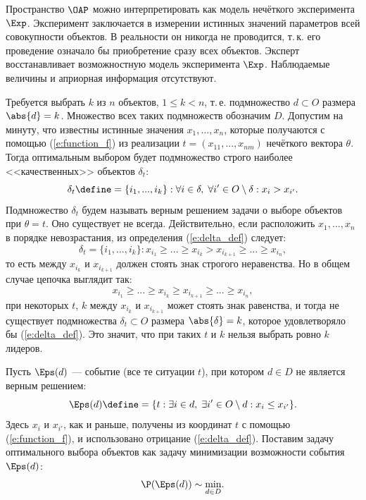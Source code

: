 Пространство $\OAP$ можно интерпретировать как модель нечёткого эксперимента $\Exp$. Эксперимент  заключается в измерении истинных значений параметров всей совокупности объектов. В реальности он никогда не проводится, т.\,к. его проведение означало бы приобретение сразу всех объектов. Эксперт восстанавливает возможностную модель эксперимента $\Exp$. Наблюдаемые величины и априорная информация отсутствуют.

Требуется выбрать $k$ из $n$ объектов, $1 \leq k < n$, т.\,е. подмножество $d \subset O$ размера $\abs{d} = k$. Множество всех таких подмножеств обозначим $D$. Допустим на минуту, что известны истинные значения $x_1, ..., x_n$, которые получаются с помощью (\ref{e:function_f}) из реализации $t = (x_{11}, ..., x_{nm})$ нечёткого вектора $\theta$. Тогда оптимальным выбором будет подмножество строго наиболее <<качественных>> объектов $\delta_t$:
\begin{equation}
    \label{e:delta_def}
    \delta_{t} \define= \{i_1, ..., i_k\}: \forall i \in \delta,\; \forall i' \in O \setminus \delta: x_i > x_{i'}. 
\end{equation}
Подмножество $\delta_{t}$ будем называть верным решением задачи о выборе объектов при $\theta = t$. Оно существует не всегда. Действительно, если расположить $x_1, ..., x_n$ в порядке невозрастания, из определения (\ref{e:delta_def}) следует:
\begin{equation*}
    \delta_{t} = \{i_1, ..., i_k\}: x_{i_1} \geq ... \geq x_{i_k} > x_{i_{k+1}} \geq ... \geq x_{i_n},   
\end{equation*}
то есть между $x_{i_k}$ и $x_{i_{k+1}}$ должен стоять знак строгого неравенства. Но в общем случае цепочка выглядит так:
\begin{equation}
    \label{e:right_order}
    x_{i_1} \geq ... \geq x_{i_k} \geq x_{i_{k+1}} \geq ... \geq x_{i_n},   
\end{equation}
при некоторых $t$, $k$ между $x_{i_k}$ и $x_{i_{k+1}}$ может стоять знак равенства, и тогда не существует подмножества $\delta_t \subset O$ размера $\abs{\delta} = k$, которое  удовлетворяло бы (\ref{e:delta_def}). Это значит, что при таких $t$ и $k$ нельзя выбрать ровно $k$ лидеров. 

Пусть $\Eps(d)$ --- событие (все те ситуации $t$), при котором $d \in D$ не является верным решением:
\begin{equation*}
  \Eps(d) \define= \{t: \exists i \in d,\; \exists i' \in O \setminus d: x_i \leq x_{i'}\}.
\end{equation*}
Здесь  $x_i$ и $x_{i'}$, как и раньше, получены из координат $t$ с помощью (\ref{e:function_f}), и использовано отрицание (\ref{e:delta_def}). Поставим задачу оптимального выбора объектов как задачу минимизации возможности события $\Eps(d)$:
\begin{equation}
  \label{e:zadacha}
  \P(\Eps(d)) \sim \underset{d \in D} \min.
\end{equation}

